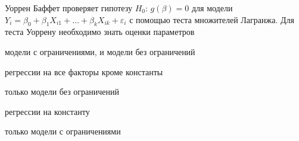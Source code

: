 
\begin{question}
Уоррен Баффет проверяет гипотезу \(H_0\): \(g(\beta)=0\) для модели
\(Y_i = \beta_0 + \beta_1 X_{i1} + \ldots + \beta_k X_{ik} + \varepsilon_i\)
с помощью теста множителей Лагранжа. Для теста Уоррену необходимо знать
оценки параметров
\begin{answerlist}
  \item модели с ограничениями, и модели без ограничений
  \item регрессии на все факторы кроме константы
  \item только модели без ограничений
  \item регрессии на константу
  \item только модели с ограничениями
\end{answerlist}
\end{question}


